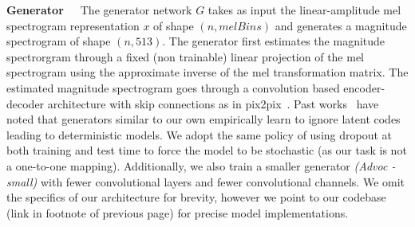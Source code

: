 \documentclass[a4paper]{article}
\begin{document}
\textbf{Generator}~~~The generator network $G$ takes as input the linear-amplitude mel spectrogram representation $x$ of shape $(n, \mathit{melBins})$ and generates a magnitude spectrogram of shape $(n, 513)$. The generator first estimates the magnitude spectrorgram through a fixed (non trainable) linear projection of the mel spectrogram using the approximate inverse of the mel transformation matrix. The estimated magnitude spectrogram goes through a convolution based encoder-decoder architecture with skip connections as in pix2pix~\cite{pix2pix}. 
Past works~\cite{Mathieu2016DeepMV,pix2pix} have noted that generators similar to our own empirically learn to ignore latent codes leading to deterministic models. 
We adopt the same policy of using dropout at both training and test time to force the model to be stochastic (as our task is not a one-to-one mapping). 
Additionally, we also train a smaller generator \textit{(Advoc - small)} with fewer convolutional layers and fewer convolutional channels. 
We omit the specifics of our architecture for brevity, however we point to our codebase (link in footnote of previous page) for precise model implementations.
\end{document}
